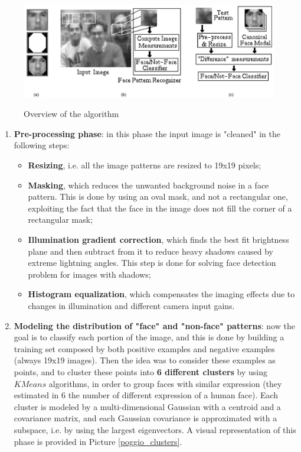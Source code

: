 \begin{figure}[h!]
		\centering
		\includegraphics[scale = 0.7]{img/poggio_overwiew.jpg}
        \label{poggio_overview}
        \caption{Overview of the algorithm}
\end{figure}

\begin{enumerate}
    \item \textbf{Pre-processing phase}: in this phase the input image is "cleaned" in the following steps:
    \begin{itemize}
        \item \textbf{Resizing}, i.e. all the image patterns are resized to 19x19 pixels;
        \item \textbf{Masking}, which reduces the unwanted background noise in a face pattern. This is done by using an oval mask, and not a rectangular one, exploiting the fact that the face in the image does not fill the corner of a rectangular mask;
        \item \textbf{Illumination gradient correction}, which finds the best fit brightness plane and then subtract from it to reduce heavy shadows caused by extreme lightning angles. This step is done for solving face detection problem for images with shadows;
        \item \textbf{Histogram equalization}, which compensates the imaging effects due to changes in illumination and different camera input gains.
    \end{itemize}
    
    \item \textbf{Modeling the distribution of "face" and "non-face" patterns}: now the goal is to classify each portion of the image, and this is done by building a training set composed by both positive examples and negative examples (always 19x19 images). Then the idea was to consider these examples as points, and to cluster these points into \textbf{6 different clusters} by using $K Means$ algorithms, in order to group faces with similar expression (they estimated in 6 the number of different expression of a human face). Each cluster is modeled by a multi-dimensional Gaussian with a centroid and a covariance matrix, and each Gaussian covariance is approximated with a subspace, i.e. by using the largest eigenvectors. A visual representation of this phase is provided in Picture \ref{poggio_clusters}.


\end{enumerate}
